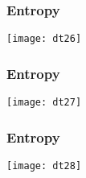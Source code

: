 \begin{frame}[fragile]\frametitle{Entropy}
\begin{center}
\texttt{[image: dt26]}
\end{center}
\end{frame}

\begin{frame}[fragile]\frametitle{Entropy}
\begin{center}
\texttt{[image: dt27]}
\end{center}
\end{frame}

\begin{frame}[fragile]\frametitle{Entropy}
\begin{center}
\texttt{[image: dt28]}
\end{center}
\end{frame}







